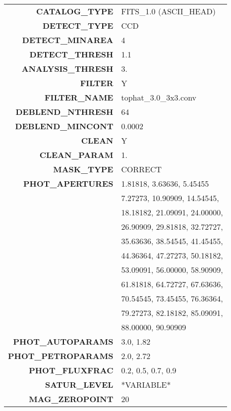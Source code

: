 \documentclass[fleqn,usenatbib]{mnras}
\begin{document}
\begin{table}
\begin{tabular}{rl}
\textbf{CATALOG\_TYPE}             & FITS\_1.0 (ASCII\_HEAD)\\
\textbf{DETECT\_TYPE}              & CCD \\
\textbf{DETECT\_MINAREA}           & 4 \\
\textbf{DETECT\_THRESH}            & 1.1 \\
\textbf{ANALYSIS\_THRESH}          & 3. \\
\textbf{FILTER}                    & Y \\
\textbf{FILTER\_NAME}              & tophat\_3.0\_3x3.conv \\
\textbf{DEBLEND\_NTHRESH}          & 64 \\
\textbf{DEBLEND\_MINCONT}          & 0.0002 \\
\textbf{CLEAN}                     & Y \\
\textbf{CLEAN\_PARAM}              & 1. \\
\textbf{MASK\_TYPE}                & CORRECT \\
\textbf{PHOT\_APERTURES}           & 1.81818, 3.63636, 5.45455 \\
                                   & 7.27273, 10.90909, 14.54545, \\
                                   & 18.18182, 21.09091, 24.00000, \\
                                   & 26.90909, 29.81818, 32.72727,\\
                                   & 35.63636, 38.54545, 41.45455,\\
                                   & 44.36364, 47.27273, 50.18182, \\
                                   & 53.09091, 56.00000, 58.90909, \\
                                   & 61.81818, 64.72727, 67.63636,\\
                                   & 70.54545, 73.45455, 76.36364,\\
                                   & 79.27273, 82.18182, 85.09091,\\
                                   & 88.00000, 90.90909\\
\textbf{PHOT\_AUTOPARAMS}          & 3.0, 1.82\\
\textbf{PHOT\_PETROPARAMS}         & 2.0, 2.72\\
\textbf{PHOT\_FLUXFRAC}            & 0.2, 0.5, 0.7, 0.9\\
\textbf{SATUR\_LEVEL}              & *VARIABLE*\\
\textbf{MAG\_ZEROPOINT}            & 20\\

\end{tabular}
\end{table}
\end{document}
